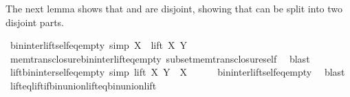 \begin{isabellebody}
\endisatagproof
{\isafoldproof}%
%
\isadelimproof
%
\endisadelimproof
%
\begin{isamarkuptext}%
The next lemma shows that  and  are disjoint, 
showing that  can be split into two disjoint parts.%
\end{isamarkuptext}\isamarkuptrue%
\isamarkupfalse%
\ bin{\isacharunderscore}{\kern0pt}inter{\isacharunderscore}{\kern0pt}lift{\isacharunderscore}{\kern0pt}self{\isacharunderscore}{\kern0pt}eq{\isacharunderscore}{\kern0pt}empty\ {\isacharbrackleft}{\kern0pt}simp{\isacharbrackright}{\kern0pt}{\isacharcolon}{\kern0pt}\ {\isachardoublequoteopen}X\ {\isasyminter}\ lift\ X\ Y\ {\isacharequal}{\kern0pt}\ {\isacharbraceleft}{\kern0pt}{\isacharbraceright}{\kern0pt}{\isachardoublequoteclose}\isanewline
%
\isadelimproof
\ \ %
\endisadelimproof
%
\isatagproof
{}\isamarkupfalse%
\ mem{\isacharunderscore}{\kern0pt}trans{\isacharunderscore}{\kern0pt}closure{\isacharunderscore}{\kern0pt}bin{\isacharunderscore}{\kern0pt}inter{\isacharunderscore}{\kern0pt}lift{\isacharunderscore}{\kern0pt}eq{\isacharunderscore}{\kern0pt}empty\ subset{\isacharunderscore}{\kern0pt}mem{\isacharunderscore}{\kern0pt}trans{\isacharunderscore}{\kern0pt}closure{\isacharunderscore}{\kern0pt}self\ \isamarkupfalse%
\ blast%
\endisatagproof
{\isafoldproof}%
%
\isadelimproof
\isanewline
%
\endisadelimproof
\isanewline
{}\isamarkupfalse%
\ lift{\isacharunderscore}{\kern0pt}bin{\isacharunderscore}{\kern0pt}inter{\isacharunderscore}{\kern0pt}self{\isacharunderscore}{\kern0pt}eq{\isacharunderscore}{\kern0pt}empty\ {\isacharbrackleft}{\kern0pt}simp{\isacharbrackright}{\kern0pt}{\isacharcolon}{\kern0pt}\ {\isachardoublequoteopen}lift\ X\ Y\ {\isasyminter}\ X\ {\isacharequal}{\kern0pt}\ {\isacharbraceleft}{\kern0pt}{\isacharbraceright}{\kern0pt}{\isachardoublequoteclose}\isanewline
%
\isadelimproof
\ \ %
\endisadelimproof
%
\isatagproof
{}\isamarkupfalse%
\ bin{\isacharunderscore}{\kern0pt}inter{\isacharunderscore}{\kern0pt}lift{\isacharunderscore}{\kern0pt}self{\isacharunderscore}{\kern0pt}eq{\isacharunderscore}{\kern0pt}empty\ \isamarkupfalse%
\ blast%
\endisatagproof
{\isafoldproof}%
%
\isadelimproof
\isanewline
%
\endisadelimproof
\isanewline
{}\isamarkupfalse%
\ lift{\isacharunderscore}{\kern0pt}eq{\isacharunderscore}{\kern0pt}lift{\isacharunderscore}{\kern0pt}if{\isacharunderscore}{\kern0pt}bin{\isacharunderscore}{\kern0pt}union{\isacharunderscore}{\kern0pt}lift{\isacharunderscore}{\kern0pt}eq{\isacharunderscore}{\kern0pt}bin{\isacharunderscore}{\kern0pt}union{\isacharunderscore}{\kern0pt}lift{\isacharcolon}{\kern0pt}\isanewline

\end{isabellebody}
